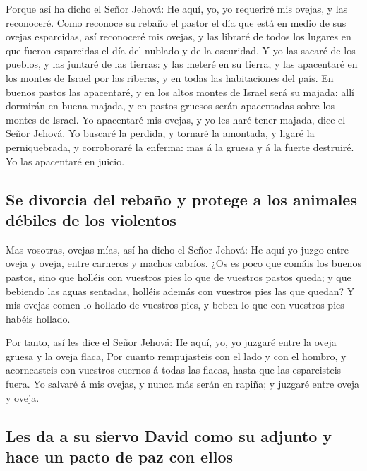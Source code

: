  Porque así ha dicho el Señor Jehová: He aquí, yo, yo
requeriré mis ovejas, y las reconoceré.  Como reconoce su
rebaño el pastor el día que está en medio de sus ovejas esparcidas, así
reconoceré mis ovejas, y las libraré de todos los lugares en que fueron
esparcidas el día del nublado y de la oscuridad.  Y yo
las sacaré de los pueblos, y las juntaré de las tierras: y las meteré en
su tierra, y las apacentaré en los montes de Israel por las riberas, y
en todas las habitaciones del país.  En buenos pastos las
apacentaré, y en los altos montes de Israel será su majada: allí
dormirán en buena majada, y en pastos gruesos serán apacentadas sobre
los montes de Israel.  Yo apacentaré mis ovejas, y yo les
haré tener majada, dice el Señor Jehová.  Yo buscaré la
perdida, y tornaré la amontada, y ligaré la perniquebrada, y corroboraré
la enferma: mas á la gruesa y á la fuerte destruiré. Yo las apacentaré
en juicio.

\hypertarget{se-divorcia-del-rebauxf1o-y-protege-a-los-animales-duxe9biles-de-los-violentos}{%
\subsection{Se divorcia del rebaño y protege a los animales débiles de
los
violentos}\label{se-divorcia-del-rebauxf1o-y-protege-a-los-animales-duxe9biles-de-los-violentos}}

 Mas vosotras, ovejas mías, así ha dicho el Señor Jehová:
He aquí yo juzgo entre oveja y oveja, entre carneros y machos cabríos.
 ¿Os es poco que comáis los buenos pastos, sino que
holléis con vuestros pies lo que de vuestros pastos queda; y que
bebiendo las aguas sentadas, holléis además con vuestros pies las que
quedan?  Y mis ovejas comen lo hollado de vuestros pies,
y beben lo que con vuestros pies habéis hollado.

 Por tanto, así les dice el Señor Jehová: He aquí, yo, yo
juzgaré entre la oveja gruesa y la oveja flaca,  Por
cuanto rempujasteis con el lado y con el hombro, y acorneasteis con
vuestros cuernos á todas las flacas, hasta que las esparcisteis fuera.
 Yo salvaré á mis ovejas, y nunca más serán en rapiña; y
juzgaré entre oveja y oveja.

\hypertarget{les-da-a-su-siervo-david-como-su-adjunto-y-hace-un-pacto-de-paz-con-ellos}{%
\subsection{Les da a su siervo David como su adjunto y hace un pacto de
paz con
ellos}\label{les-da-a-su-siervo-david-como-su-adjunto-y-hace-un-pacto-de-paz-con-ellos}}


